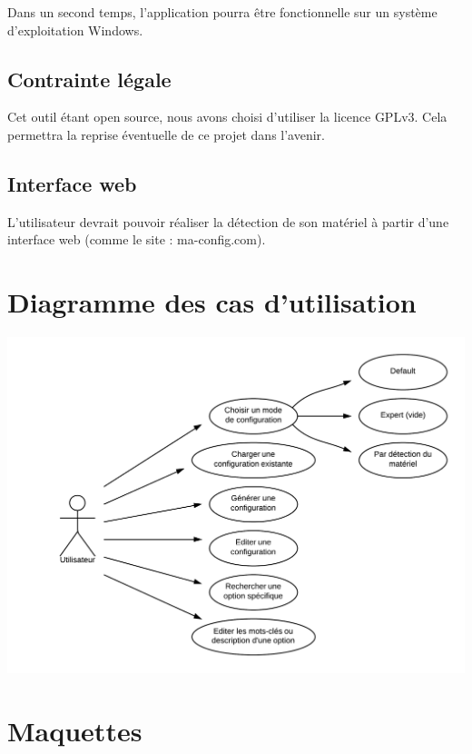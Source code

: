 \documentclass[16pts]{report}
\begin{document}
Dans un second temps, l'application pourra être fonctionnelle sur un système
d'exploitation Windows.


\section{Contrainte légale}
\label{sec:Contrainte légale}

Cet outil étant open source, nous avons choisi d'utiliser la licence GPLv3.
Cela permettra la reprise éventuelle de ce projet dans l'avenir.


\section{Interface web}
\label{sec:Interface web}

L’utilisateur devrait pouvoir réaliser la détection de son matériel à partir
d’une interface web (comme le site : ma-config.com).

\chapter{Diagramme des cas d'utilisation}
\label{cha:Diagramme des cas d'utilisation}
\includegraphics[scale=0.25]{illustrations/diagramme_cas_utilisation.png}


\chapter{Maquettes}
\label{cha:Maquettes}
\end{document}
